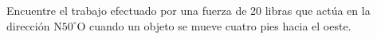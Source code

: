 \item Encuentre el trabajo efectuado por una fuerza de 20 libras que actúa en la dirección N$50^\circ$O cuando un objeto se mueve cuatro pies hacia el oeste.
